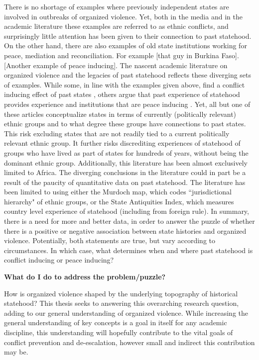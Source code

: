 \documentclass[12pt]{article}
\begin{document}
There is no shortage of examples where previously independent states are
involved in outbreaks of organized violence. Yet, both in the media and in the
academic literature these examples are referred to as ethnic conflicts, and
surprisingly little attention has been given to their connection to past
statehood. On the other hand, there are also examples of old state institutions
working for peace, mediation and reconciliation. For example [that guy in
Burkina Faso]. [Another example of peace inducing]. The nascent academic
literature on organized violence and the legacies of past statehood reflects
these diverging sets of examples. While some, in line with the examples given
above, find a conflict inducing effect of past states \citep{Englebert2002,
Paine2019}, others argue that past experience of statehood provides experience
and institutions that are peace inducing \citep{Wig2016, Wig2018,
Depetris-Chauvin2016}. Yet, all but one of these articles conceptualize states
in terms of currently (politically relevant) ethnic groups and to what degree
these groups have connections to past states. This risk excluding states that
are not readily tied to a current politically relevant ethnic group. It further
risks discrediting experiences of statehood of groups who have lived as part of
states for hundreds of years, without being the dominant ethnic group.
Additionally, this literature has been almost exclusively limited to Africa. The
diverging conclusions in the literature could in part be a result of the paucity
of quantitative data on past statehood. The literature has been limited to using
either the Murdoch map, which codes ``jurisdictional hierarchy" of ethnic
groups, or the State Antiquities Index, which measures country level experience
of statehood (including from foreign rule). In summary, there is a need for more
and better data, in order to answer the puzzle of whether there is a positive or
negative association between state histories and organized violence.
Potentially, both statements are true, but vary according to circumstances. In
which case, what determines when and where past statehood is conflict inducing
or peace inducing?

\textbf{What do I do to address the problem/puzzle?}

How is organized violence shaped by the underlying topography of historical
statehood? This thesis seeks to answering this overarching research question,
adding to our general understanding of organized violence. While increasing the
general understanding of key concepts is a goal in itself for any academic
discipline, this understanding will hopefully contribute to the vital goals of
conflict prevention and de-escalation, however small and indirect this
contribution may be.
\end{document}
